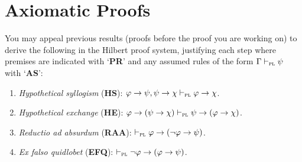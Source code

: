 \documentclass[a4paper, 11pt]{article}                  %
\begin{document}
\section{Axiomatic Proofs}

You may appeal previous results (proofs before the proof you are working on) to derive the following in the Hilbert proof system, justifying each step where premises are indicated with `\textbf{PR}' and any assumed rules of the form $\Gamma \vdash_{\textsc{pl}} \psi$ with `\textbf{AS}':

\begin{enumerate}

	\item \textit{Hypothetical syllogism} (\textbf{HS}): $\varphi \rightarrow \psi, \psi \rightarrow \chi \vdash_{\textsc{pl}} \varphi \rightarrow \chi$.

	\item \textit{Hypothetical exchange} (\textbf{HE}): $\varphi \rightarrow (\psi \rightarrow \chi) \vdash_{\textsc{pl}} \psi \rightarrow (\varphi \rightarrow \chi)$.

	\item \textit{Reductio ad absurdum} (\textbf{RAA}): $\vdash_{\textsc{pl}} \varphi \rightarrow (\neg\varphi \rightarrow \psi)$.

	\item \textit{Ex falso quidlobet} (\textbf{EFQ}): $\vdash_{\textsc{pl}} \neg\varphi \rightarrow (\varphi \rightarrow \psi)$.


\end{enumerate}
\end{document}
